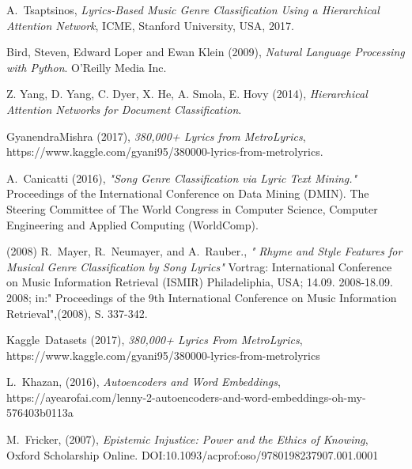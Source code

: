 \documentclass[journal]{IEEEtran}
\begin{document}
\begin{thebibliography}{6}

A.~Tsaptsinos, \emph{Lyrics-Based Music Genre Classification Using a Hierarchical Attention Network}, \relax ICME, Stanford University, USA, 2017.

Bird, Steven, Edward Loper and Ewan Klein (2009), \emph{Natural Language Processing with Python}. \relax O'Reilly Media Inc.

Z. Yang, D. Yang, C. Dyer, X. He, A. Smola, E. Hovy (2014), \emph{Hierarchical Attention Networks for Document Classification}.

GyanendraMishra (2017), \emph{380,000+ Lyrics from MetroLyrics}, https://www.kaggle.com/gyani95/380000-lyrics-from-metrolyrics.

A.~Canicatti (2016), \emph{ "Song Genre Classification via Lyric Text Mining."} \relax Proceedings of the International Conference on Data Mining (DMIN). The Steering Committee of The World Congress in Computer Science, Computer Engineering and Applied Computing (WorldComp).

 (2008) R.~Mayer, R.~Neumayer, and A.~Rauber., \emph{" Rhyme and Style Features for Musical Genre Classification by Song Lyrics"} \relax Vortrag: International Conference on Music Information Retrieval (ISMIR) Philadeliphia, USA; 14.09. 2008-18.09. 2008; in:" Proceedings of the 9th International Conference on Music Information Retrieval",(2008), S. 337-342.

 Kaggle~Datasets (2017), \emph{380,000+ Lyrics From MetroLyrics}, \relax https://www.kaggle.com/gyani95/380000-lyrics-from-metrolyrics

 L.~Khazan, (2016), \emph{Autoencoders and Word Embeddings}, \relax https://ayearofai.com/lenny-2-autoencoders-and-word-embeddings-oh-my-576403b0113a

 M.~Fricker, (2007), \emph{Epistemic Injustice: Power and the Ethics of Knowing}, \relax Oxford Scholarship Online. DOI:10.1093/acprof:oso/9780198237907.001.0001

\end{thebibliography}

\end{document}

